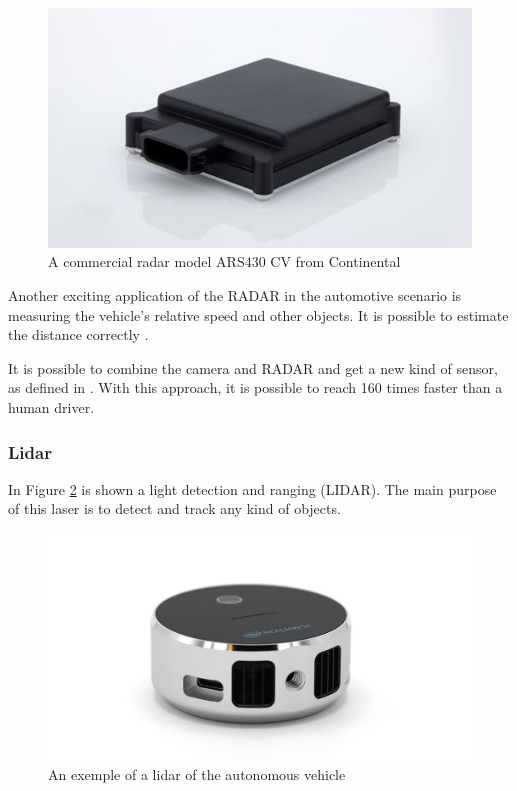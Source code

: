 \begin{figure}[H]
\centering
\includegraphics[width=120mm]{imagens/radar.jpg}
\caption{A commercial radar model ARS430 CV from Continental}
\label{fig:camera}
\end{figure}

Another exciting application of the RADAR in the automotive scenario is measuring the vehicle's relative speed and other objects. It is possible to estimate the distance correctly  \cite{stevenson2011long}.

It is possible to combine the camera and RADAR and get a new kind of sensor, as defined in \cite{kamerad}. With this approach, it is possible to reach 160 times faster than a human driver.

\subsubsection{Lidar}
In Figure \ref{fig:lidar} is shown a light detection and ranging (LIDAR). The main purpose of this laser is to detect and track any kind of objects. 
\begin{figure}[H]
\centering
\includegraphics[width=\columnwidth]{imagens/lidar.jpg}
\caption{An exemple of a lidar of the autonomous vehicle}
\label{fig:lidar}
\end{figure}

